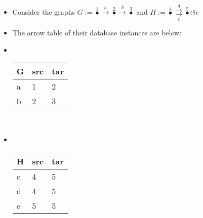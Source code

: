 \begin{itemize}
    \item  Consider the graphs $G:=\boxed{\overset{1}\bullet \xrightarrow{a} \overset{2}\bullet \xrightarrow{b}\overset{3}\bullet}$ and $H:=\boxed{\overset{4}\bullet \overset{d}{\underset{c}{\rightrightarrows}}\overset{5}\bullet\circlearrowleft e}$
    \item The arrow table of their database instances are below:
    \item  \,\begin{minipage}{0.48\textwidth}

            \begin{tabular}{|l|l|l|}
              \hline
              G & src & tar \\ \hline
              a & 1   & 2   \\ \hline
              b & 2   & 3   \\ \hline
            \end{tabular}
          \end{minipage}\,
    \item    \,\begin{minipage}{0.48\textwidth}

            \begin{tabular}{|l|l|l|}
              \hline
              H & src & tar \\ \hline
              c & 4   & 5   \\ \hline
              d & 4   & 5   \\ \hline
              e & 5   & 5   \\ \hline
            \end{tabular}
          \end{minipage}\,

  \end{itemize}
